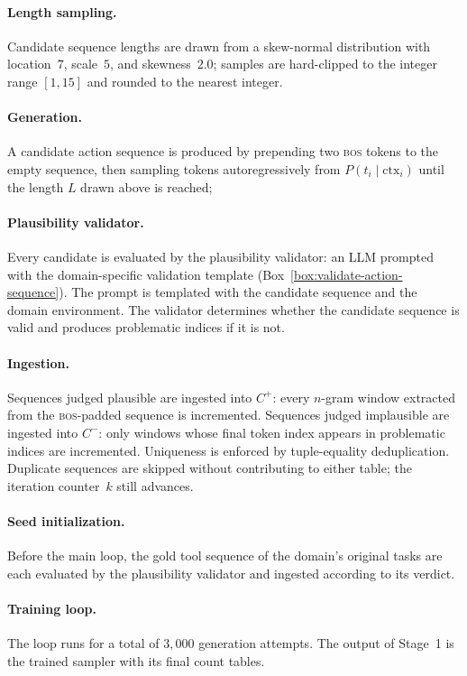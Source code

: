 \paragraph{Length sampling.}
Candidate sequence lengths are drawn from a skew-normal distribution with location~$7$, scale~$5$, and skewness~$2.0$; samples are hard-clipped to the integer range $[1, 15]$ and rounded to the nearest integer.

\paragraph{Generation.}
A candidate action sequence is produced by prepending two \textsc{bos} tokens to the empty sequence, then sampling tokens autoregressively from $P(t_i \mid \text{ctx}_i)$ until the length $L$ drawn above is reached;

\paragraph{Plausibility validator.}
Every candidate is evaluated by the plausibility validator: an LLM prompted with the domain-specific validation template (Box~\ref{box:validate-action-sequence}). The prompt is templated with the candidate sequence and the domain environment. The validator determines whether the candidate sequence is valid and produces problematic indices if it is not.

\paragraph{Ingestion.}
Sequences judged plausible are ingested into $C^+$: every $n$-gram window extracted from the \textsc{bos}-padded sequence is incremented. Sequences judged implausible are ingested into $C^-$: only windows whose final token index appears in problematic indices are incremented.  Uniqueness is enforced by tuple-equality deduplication. Duplicate sequences are skipped without contributing to either table; the iteration counter~$k$ still advances.

\paragraph{Seed initialization.}
Before the main loop, the gold tool sequence of the domain's original tasks are each evaluated by the plausibility validator and ingested according to its verdict.

\paragraph{Training loop.}
The loop runs for a total of $3{,}000$ generation attempts. The output of Stage~1 is the trained sampler with its final count tables.

